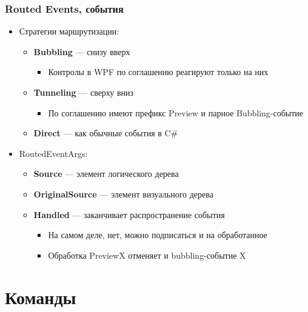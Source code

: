 \documentclass[xetex,mathserif,serif]{beamer}
\begin{document}
	\begin{frame}
		\frametitle{Routed Events, события}
		\begin{itemize}
			\item Стратегии маршрутизации:
			\begin{itemize}
				\item \textbf{Bubbling} --- снизу вверх
				\begin{itemize}
					\item Контролы в WPF по соглашению реагируют только на них
				\end{itemize}
				\item \textbf{Tunneling} --- сверху вниз
				\begin{itemize}
					\item По соглашению имеют префикс Preview и парное Bubbling-событие
				\end{itemize}
				\item \textbf{Direct} --- как обычные события в C\#
			\end{itemize}
			\item RoutedEventArgs:
			\begin{itemize}
				\item \textbf{Source} --- элемент логического дерева
				\item \textbf{OriginalSource} --- элемент визуального дерева
				\item \textbf{Handled} --- заканчивает распространение события
				\begin{itemize}
					\item На самом деле, нет, можно подписаться и на обработанное
					\item Обработка PreviewX отменяет и bubbling-событие X
				\end{itemize}
			\end{itemize}
		\end{itemize}
	\end{frame}

	\section{Команды}
\end{document}
